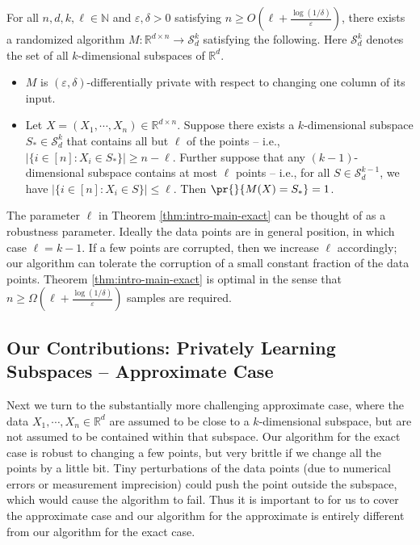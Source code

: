 \begin{theorem}\label{thm:intro-main-exact}
For all $n,d,k,\ell \in \mathbb{N}$ and $\varepsilon,\delta>0$ satisfying $n \ge O\left(\ell + \frac{\log(1/\delta)}{\varepsilon}\right)$, there exists a randomized algorithm $M : \mathbb{R}^{d \times n} \to \mathcal{S}_d^k$ satisfying the following. Here $\mathcal{S}_d^k$ denotes the set of all $k$-dimensional subspaces of $\mathbb{R}^d$.
\begin{itemize}
    \item $M$ is $(\varepsilon,\delta)$-differentially private with respect to changing one column of its input.
    \item Let $X = (X_1, \cdots, X_n) \in \mathbb{R}^{d \times n}$.
    Suppose there exists a $k$-dimensional subspace $S_* \in \mathcal{S}_d^k$ that contains all but $\ell$ of the points -- i.e., $|\{i \in [n] : X_i \in S_*\}| \ge n -\ell$.
    Further suppose that any $(k-1)$-dimensional subspace contains at most $\ell$ points -- i.e., for all $S \in \mathcal{S}_d^{k-1}$, we have $|\{i \in [n] : X_i \in S\}| \le \ell$. 
    Then $\pr{}{M(X)=S_*}=1$.
\end{itemize}
\end{theorem}

The parameter $\ell$ in Theorem \ref{thm:intro-main-exact} can be thought of as a robustness parameter. Ideally the data points are in general position, in which case $\ell=k-1$. If a few points are corrupted, then we increase $\ell$ accordingly; our algorithm can tolerate the corruption of a small constant fraction of the data points.
Theorem \ref{thm:intro-main-exact} is optimal in the sense that $n \ge \Omega\left(\ell + \frac{\log(1/\delta)}{\varepsilon}\right)$ samples are required.

\subsection{Our Contributions: Privately Learning Subspaces -- Approximate Case}

Next we turn to the substantially more challenging approximate case, where the data $X_1, \cdots, X_n \in \mathbb{R}^d$ are assumed to be close to a $k$-dimensional subspace, but are not assumed to be contained within that subspace. Our algorithm for the exact case is robust to changing a few points, but very brittle if we change all the points by a little bit. Tiny perturbations of the data points (due to numerical errors or measurement imprecision) could push the point outside the subspace, which would cause the algorithm to fail. Thus it is important to for us to cover the approximate case and our algorithm for the approximate is entirely different from our algorithm for the exact case. 

